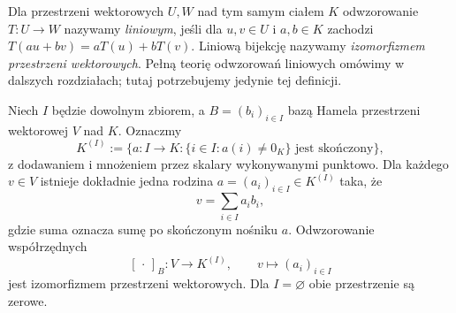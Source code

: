 Dla przestrzeni wektorowych \(U,W\) nad tym samym
ciałem \(K\) odwzorowanie \(T\colon U\to W\)
nazywamy \emph{liniowym}, jeśli dla
\(u,v\in U\) i \(a,b\in K\) zachodzi
\(T(au+bv)=aT(u)+bT(v)\).
Liniową bijekcję nazywamy
\emph{izomorfizmem przestrzeni wektorowych}.
Pełną teorię odwzorowań liniowych omówimy
w dalszych rozdziałach; tutaj potrzebujemy
jedynie tej definicji.

\begin{twierdzenie}
\label{thm:lin-wspolrzedne-hamela}
Niech \(I\) będzie dowolnym zbiorem,
a \(B=(b_i)_{i\in I}\) bazą Hamela przestrzeni
wektorowej \(V\) nad \(K\). Oznaczmy
\[
 K^{(I)}:=
 \bigl\{a\colon I\to K:
 \{i\in I:a(i)\neq0_K\}\text{ jest skończony}\bigr\},
\]
z dodawaniem i mnożeniem przez skalary
wykonywanymi punktowo.
Dla każdego \(v\in V\) istnieje dokładnie
jedna rodzina \(a=(a_i)_{i\in I}\in K^{(I)}\)
taka, że
\[
 v=\sum_{i\in I}a_ib_i,
\]
gdzie suma oznacza sumę po skończonym nośniku \(a\).
Odwzorowanie współrzędnych
\[
 [\,\cdot\,]_B\colon V\longrightarrow K^{(I)},
 \qquad v\longmapsto(a_i)_{i\in I}
\]
jest izomorfizmem przestrzeni wektorowych.
Dla \(I=\varnothing\) obie przestrzenie są zerowe.
\end{twierdzenie}
